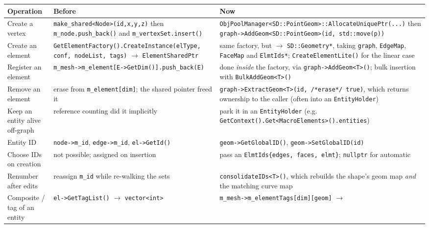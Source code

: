 \begin{table}[h!]
  \centering
  \small
  \begin{tabular}{p{}p{}p{}}
    \hline
    \textbf{Operation} & \textbf{Before} & \textbf{Now}\\
    \hline
    Create a vertex &
    \texttt{make\_shared<Node>(id,x,y,z)} then
    \texttt{m\_node.push\_back()} and \texttt{m\_vertexSet.insert()} &
    \texttt{ObjPoolManager<SD::PointGeom>::AllocateUniquePtr(...)} then
    \texttt{graph->AddGeom<SD::PointGeom>(id, std::move(p))}\\
    \hline
    Create an element &
    \texttt{GetElementFactory().CreateInstance(elType, conf, nodeList,
      tags)} $\rightarrow$ \texttt{ElementSharedPtr} &
    same factory, but $\rightarrow$ \texttt{SD::Geometry*}, taking
    \texttt{graph}, \texttt{EdgeMap}, \texttt{FaceMap} and
    \texttt{ElmtIds*}; \texttt{CreateElementLite()} for the linear
    case\\
    \hline
    Register an element &
    \texttt{m\_mesh->m\_element[E->GetDim()].push\_back(E)} &
    done \textit{inside} the factory, via
    \texttt{graph->AddGeom<T>()}; bulk insertion with
    \texttt{BulkAddGeom<T>()}\\
    \hline
    Remove an element &
    erase from \texttt{m\_element[dim]}; the shared pointer freed it &
    \texttt{graph->ExtractGeom<T>(id, /*erase*/ true)}, which returns
    ownership to the caller (often into an \texttt{EntityHolder})\\
    \hline
    Keep an entity alive off-graph &
    reference counting did it implicitly &
    park it in an \texttt{EntityHolder} (e.g.
    \texttt{GetContext().Get<MacroElements>().entities})\\
    \hline
    Entity ID &
    \texttt{node->m\_id}, \texttt{edge->m\_id}, \texttt{el->GetId()} &
    \texttt{geom->GetGlobalID()}, \texttt{geom->SetGlobalID(id)}\\
    \hline
    Choose IDs on creation &
    not possible; assigned on insertion &
    pass an \texttt{ElmtIds\{edges, faces, elmt\}}; \texttt{nullptr}
    for automatic\\
    \hline
    Renumber after edits &
    reassign \texttt{m\_id} while re-walking the sets &
    \texttt{consolidateIDs<T>()}, which rebuilds the shape's geom map
    \textit{and} the matching curve map\\
    \hline
    Composite / tag of an entity &
    \texttt{el->GetTagList()} $\rightarrow$ \texttt{vector<int>} &
    \texttt{m\_mesh->m\_elementTags[dim][geom]} $\rightarrow$

\end{tabular}
\end{table}
